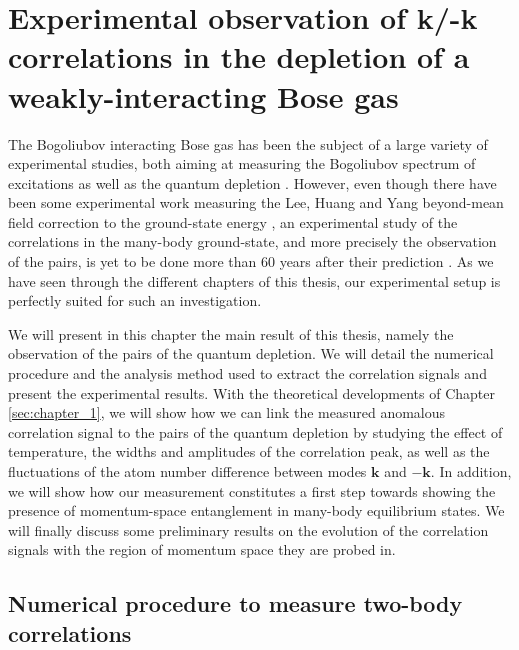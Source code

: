 
\chapter{Experimental observation of k/-k correlations in the depletion of a weakly-interacting Bose gas}

\label{sec:chapter_4}

The Bogoliubov interacting Bose gas has been the subject of a large variety of experimental studies, both aiming at measuring the Bogoliubov spectrum of excitations \cite{fontaine2018,miller1962,ozeri2005,stepanov2019} as well as the quantum depletion \cite{chang2016,lopes2017,xu2006observation}. However, even though there have been some experimental work measuring the Lee, Huang and Yang beyond-mean field correction to the ground-state energy \cite{navon2010equation,skov2021observation}, an experimental study of the correlations in the many-body ground-state, and more precisely the observation of the \kmk pairs, is yet to be done more than 60 years after their prediction \cite{lee1957}. As we have seen through the different chapters of this thesis, our experimental setup is perfectly suited for such an investigation. 

We will present in this chapter the main result of this thesis, namely the observation of the \kmk pairs of the quantum depletion. We will detail the numerical procedure and the analysis method used to extract the correlation signals and present the experimental results. With the theoretical developments of Chapter \ref{sec:chapter_1}, we will show how we can link the measured anomalous correlation signal to the \kmk pairs of the quantum depletion by studying the effect of temperature, the widths and amplitudes of the correlation peak, as well as the fluctuations of the atom number difference between modes $\bm{k}$ and $-\bm{k}$. In addition, we will show how our measurement constitutes a first step towards showing the presence of momentum-space entanglement in many-body equilibrium states. We will finally discuss some preliminary results on the evolution of the correlation signals with the region of momentum space they are probed in.

\section{Numerical procedure to measure two-body correlations}

\label{sec:numerical_calculation}

